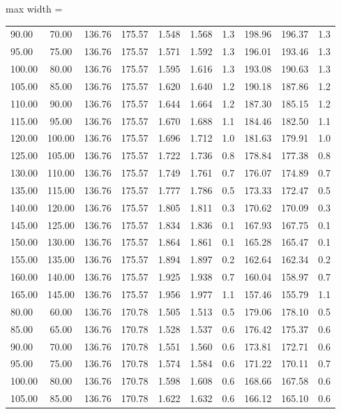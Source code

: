 \documentclass[english]{SPFShortReport}
\begin{document}
\begin{table}[!ht]
\begin{adjustbox}{max width =\textwidth}
\begin{tabular}{l | c c c c c c c c c }
90.00 & 70.00 & 136.76 & 175.57 & 1.548 & 1.568 & 1.3 & 198.96 & 196.37 & 1.3\\ 
95.00 & 75.00 & 136.76 & 175.57 & 1.571 & 1.592 & 1.3 & 196.01 & 193.46 & 1.3\\ 
100.00 & 80.00 & 136.76 & 175.57 & 1.595 & 1.616 & 1.3 & 193.08 & 190.63 & 1.3\\ 
105.00 & 85.00 & 136.76 & 175.57 & 1.620 & 1.640 & 1.2 & 190.18 & 187.86 & 1.2\\ 
110.00 & 90.00 & 136.76 & 175.57 & 1.644 & 1.664 & 1.2 & 187.30 & 185.15 & 1.2\\ 
115.00 & 95.00 & 136.76 & 175.57 & 1.670 & 1.688 & 1.1 & 184.46 & 182.50 & 1.1\\ 
120.00 & 100.00 & 136.76 & 175.57 & 1.696 & 1.712 & 1.0 & 181.63 & 179.91 & 1.0\\ 
125.00 & 105.00 & 136.76 & 175.57 & 1.722 & 1.736 & 0.8 & 178.84 & 177.38 & 0.8\\ 
130.00 & 110.00 & 136.76 & 175.57 & 1.749 & 1.761 & 0.7 & 176.07 & 174.89 & 0.7\\ 
135.00 & 115.00 & 136.76 & 175.57 & 1.777 & 1.786 & 0.5 & 173.33 & 172.47 & 0.5\\ 
140.00 & 120.00 & 136.76 & 175.57 & 1.805 & 1.811 & 0.3 & 170.62 & 170.09 & 0.3\\ 
145.00 & 125.00 & 136.76 & 175.57 & 1.834 & 1.836 & 0.1 & 167.93 & 167.75 & 0.1\\ 
150.00 & 130.00 & 136.76 & 175.57 & 1.864 & 1.861 & 0.1 & 165.28 & 165.47 & 0.1\\ 
155.00 & 135.00 & 136.76 & 175.57 & 1.894 & 1.897 & 0.2 & 162.64 & 162.34 & 0.2\\ 
160.00 & 140.00 & 136.76 & 175.57 & 1.925 & 1.938 & 0.7 & 160.04 & 158.97 & 0.7\\ 
165.00 & 145.00 & 136.76 & 175.57 & 1.956 & 1.977 & 1.1 & 157.46 & 155.79 & 1.1\\ 
80.00 & 60.00 & 136.76 & 170.78 & 1.505 & 1.513 & 0.5 & 179.06 & 178.10 & 0.5\\ 
85.00 & 65.00 & 136.76 & 170.78 & 1.528 & 1.537 & 0.6 & 176.42 & 175.37 & 0.6\\ 
90.00 & 70.00 & 136.76 & 170.78 & 1.551 & 1.560 & 0.6 & 173.81 & 172.71 & 0.6\\ 
95.00 & 75.00 & 136.76 & 170.78 & 1.574 & 1.584 & 0.6 & 171.22 & 170.11 & 0.7\\ 
100.00 & 80.00 & 136.76 & 170.78 & 1.598 & 1.608 & 0.6 & 168.66 & 167.58 & 0.6\\ 
105.00 & 85.00 & 136.76 & 170.78 & 1.622 & 1.632 & 0.6 & 166.12 & 165.10 & 0.6\\ 

\end{tabular}
\end{adjustbox}
\end{table}
\end{document}
